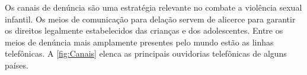 \begin{figure}
  \vspace{1pt}
\end{figure}

Os canais de denúncia são uma estratégia relevante no combate a violência sexual infantil. Os meios de comunicação para delação servem de alicerce para garantir os direitos legalmente estabelecidos das crianças e dos adolescentes. Entre os meios de denúncia mais amplamente presentes pelo mundo estão as linhas telefônicas. A \autoref{fig:Canais} elenca as principais ouvidorias telefônicas de alguns países.

